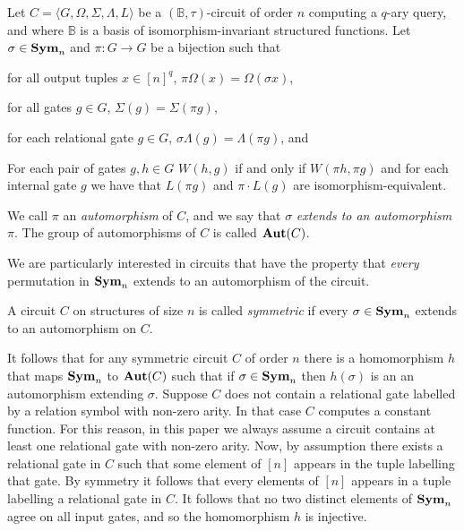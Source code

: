 \documentclass[../paper.tex]{subfiles}
\begin{document}
\begin{definition}[Automorphism]\label{defn:automorphism}
  Let $C = \langle G, \Omega, \Sigma, \Lambda, L\rangle$ be a
  $(\mathbb{B},\tau)$-circuit of order $n$ computing a $q$-ary query, and where
  $\mathbb{B}$ is a basis of isomorphism-invariant structured functions. Let
  $\sigma \in \text{\textbf{Sym}}_n$ and $\pi: G \rightarrow G$ be a bijection such that
  \begin{myitemize}
  \item for all output tuples $x \in [n]^q$, $\pi \Omega (x) = \Omega (\sigma
    x)$,
  \item for all gates $g \in G$, $\Sigma (g) = \Sigma (\pi g)$,
  \item for each relational gate $g \in G$, $\sigma \Lambda (g) = \Lambda (\pi
    g)$, and
  \item For each pair of gates $g, h \in G$ $W(h,g)$ if and only if $W(\pi h,
    \pi g)$ and for each internal gate $g$ we have that $L(\pi g)$ and $ \pi
    \cdot L(g)$ are isomorphism-equivalent.
  \end{myitemize}
  We call $\pi$ an \emph{automorphism} of $C$, and we say that $\sigma$
  \emph{extends to an automorphism} $\pi$. The group of automorphisms of $C$ is
  called $\text{\textbf{Aut}} (C)$.
\end{definition}

We are particularly interested in circuits that have the property that
\emph{every} permutation in $\text{\textbf{Sym}}_n$ extends to an automorphism of the circuit.

\begin{definition}[Symmetry]
  A circuit $C$ on structures of size $n$ is called \emph{symmetric} if every
  $\sigma \in \text{\textbf{Sym}}_n$ extends to an automorphism on $C$.
\end{definition}

It follows that for any symmetric circuit $C$ of order $n$ there is a
homomorphism $h$ that maps $\text{\textbf{Sym}}_n$ to $\text{\textbf{Aut}}(C)$ such that if $\sigma \in
\text{\textbf{Sym}}_n$ then $h(\sigma)$ is an an automorphism extending $\sigma$. Suppose $C$
does not contain a relational gate labelled by a relation symbol with non-zero
arity. In that case $C$ computes a constant function. For this reason, in this
paper we always assume a circuit contains at least one relational gate with
non-zero arity. Now, by assumption there exists a relational gate in $C$ such
that some element of $[n]$ appears in the tuple labelling that gate. By symmetry
it follows that every elements of $[n]$ appears in a tuple labelling a
relational gate in $C$. It follows that no two distinct elements of $\text{\textbf{Sym}}_n$
agree on all input gates, and so the homomorphism $h$ is injective.
\end{document}
